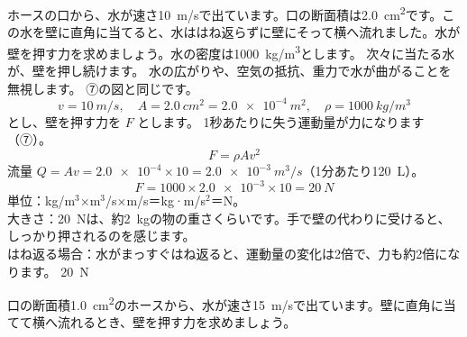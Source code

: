 \label{ph:力-3:ex14}
\begin{phreidai}[ホースの水が壁を押す力]
ホースの口から、水が速さ\qty{10}{m/s}で出ています。口の断面積は\qty{2.0}{cm^2}です。この水を壁に直角に当てると、水ははね返らずに壁にそって横へ流れました。水が壁を押す力を求めましょう。水の密度は\qty{1000}{kg/m^3}とします。
\phbamen
次々に当たる水が、壁を押し続けます。
\phmushi
水の広がりや、空気の抵抗、重力で水が曲がることを無視します。
\phzu
⑦の図と同じです。
\[v=\qty{10}{m/s},\quad A=\qty{2.0}{cm^2}=\qty{2.0e-4}{m^2},\quad \rho=\qty{1000}{kg/m^3}\]
とし、壁を押す力を $F$ とします。
\phriyu
1秒あたりに失う運動量が力になります（⑦）。
\phtateru
\[F=\rho Av^2\]
\phtoku
流量 $Q=Av=\num{2.0e-4}\times10=\qty{2.0e-3}{m^3/s}$（1分あたり\qty{120}{L}）。
\[F=1000\times\num{2.0e-3}\times10=\qty{20}{N}\]
\phtashikame
単位：kg/m$^3$×m$^3$/s×m/s＝kg·m/s$^2$＝N。\\
大きさ：\qty{20}{N}は、約\qty{2}{kg}の物の重さくらいです。手で壁の代わりに受けると、しっかり押されるのを感じます。\\
はね返る場合：水がまっすぐはね返ると、運動量の変化は2倍で、力も約2倍になります。
\kotae \qty{20}{N}
\end{phreidai}
\begin{jibun}
口の断面積\qty{1.0}{cm^2}のホースから、水が速さ\qty{15}{m/s}で出ています。壁に直角に当てて横へ流れるとき、壁を押す力を求めましょう。
\end{jibun}

